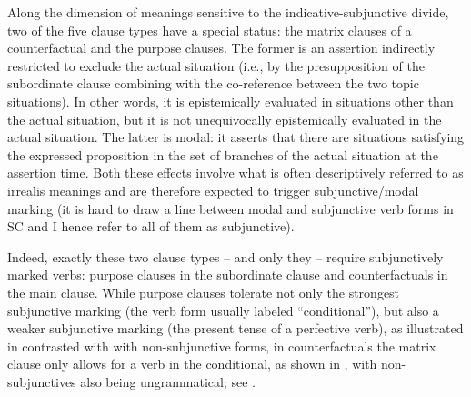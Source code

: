 \documentclass[output=paper,
colorlinks,
citecolor=brown,
newtxmath
]{langscibook}
\begin{document}
Along the dimension of meanings sensitive to the indicative-subjunctive divide, two of the five clause types have a special status: the matrix clauses of a counterfactual and the purpose clauses. The former is an assertion indirectly restricted to exclude the actual situation (i.e., by the presupposition of the subordinate clause combining with the co-reference between the two topic situations). In other words, it is epistemically evaluated in situations other than the actual situation, but it is not unequivocally epistemically evaluated in the actual situation. The latter is modal: it asserts that there are situations satisfying the expressed proposition in the set of branches of the actual situation at the assertion time. Both these effects involve what is often descriptively referred to as irrealis meanings \citep{Chung:1985} and are therefore expected to trigger subjunctive/modal marking (it is hard to draw a line between modal and subjunctive verb forms in SC and I hence refer to all of them as subjunctive).

Indeed, exactly these two clause types -- and only they -- require subjunctively marked verbs: purpose clauses in the subordinate clause and counterfactuals in the main clause. While purpose clauses tolerate not only the strongest subjunctive marking (the verb form usually labeled ``conditional''), but also a weaker subjunctive marking (the present tense of a perfective verb), as illustrated in  contrasted with  with non-subjunctive forms, in counterfactuals the matrix clause only allows for a verb in the conditional, as shown in , with non-subjunctives also being ungrammatical; see .

\ea\label{ex:Final-verb}
\label{ex:Final-verb-a}
\label{ex:Final-verb-b}
\label{ex:Counter-verb-a}
\label{ex:Counter-verb-b}
\z\z
\end{document}
